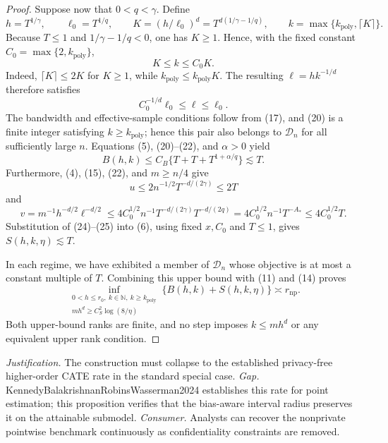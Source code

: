 \documentclass{article}
\begin{document}
\begin{proof}
Suppose now that \(0<q<\gamma\).  Define
\[
 h=T^{1/\gamma},\qquad \ell_0=T^{1/q},\qquad
 K=(h/\ell_0)^d=T^{d(1/\gamma-1/q)},
 \qquad
 k=\max\{k_{\mathrm{poly}},\lceil K\rceil\}.
 \tag{20}
\]
Because \(T\le1\) and \(1/\gamma-1/q<0\), one has \(K\ge1\).  Hence, with the fixed constant \(C_0=\max\{2,k_{\mathrm{poly}}\}\),
\[
 K\le k\le C_0K.
 \tag{21}
\]
Indeed, \(\lceil K\rceil\le2K\) for \(K\ge1\), while \(k_{\mathrm{poly}}\le k_{\mathrm{poly}}K\).  The resulting \(\ell=h k^{-1/d}\) therefore satisfies
\[
 C_0^{-1/d}\ell_0\le\ell\le\ell_0.
 \tag{22}
\]
The bandwidth and effective-sample conditions follow from (17), and (20) is a finite integer satisfying \(k\ge k_{\mathrm{poly}}\); hence this pair also belongs to \(\mathcal D_n\) for all sufficiently large \(n\).  Equations (5), (20)--(22), and \(\alpha>0\) yield
\[
 B(h,k)
 \le C_B\{T+T+T^{1+\alpha/q}\}
 \lesssim T.
 \tag{23}
\]
Furthermore, (4), (15), (22), and \(m\ge n/4\) give
\[
 u\le2n^{-1/2}T^{-d/(2\gamma)}\le2T
 \tag{24}
\]
and
\[
 v=m^{-1}h^{-d/2}\ell^{-d/2}
 \le4C_0^{1/2}n^{-1}T^{-d/(2\gamma)}T^{-d/(2q)}
 =4C_0^{1/2}n^{-1}T^{-A_*}\le4C_0^{1/2}T.
 \tag{25}
\]
Substitution of (24)--(25) into (6), using fixed \(x,C_0\) and \(T\le1\), gives \(S(h,k,\eta)\lesssim T\).

In each regime, we have exhibited a member of \(\mathcal D_n\) whose objective is at most a constant multiple of \(T\).  Combining this upper bound with (11) and (14) proves
\[
 \inf_{\substack{0<h\le r_0,\ k\in\mathbb N,\ k\ge k_{\mathrm{poly}}\\
                  m h^d\ge C_S^2\log(8/\eta)}}
 \{B(h,k)+S(h,k,\eta)\}
 \asymp r_{\mathrm{np}}.
\]
Both upper-bound ranks are finite, and no step imposes \(k\le m h^d\) or any equivalent upper rank condition.
\end{proof}
\par\smallskip\noindent \textit{Justification.} The construction must collapse to the established privacy-free higher-order CATE rate in the standard special case. \textit{Gap.} KennedyBalakrishnanRobinsWasserman2024 establishes this rate for point estimation; this proposition verifies that the bias-aware interval radius preserves it on the attainable submodel. \textit{Consumer.} Analysts can recover the nonprivate pointwise benchmark continuously as confidentiality constraints are removed.
\end{document}
